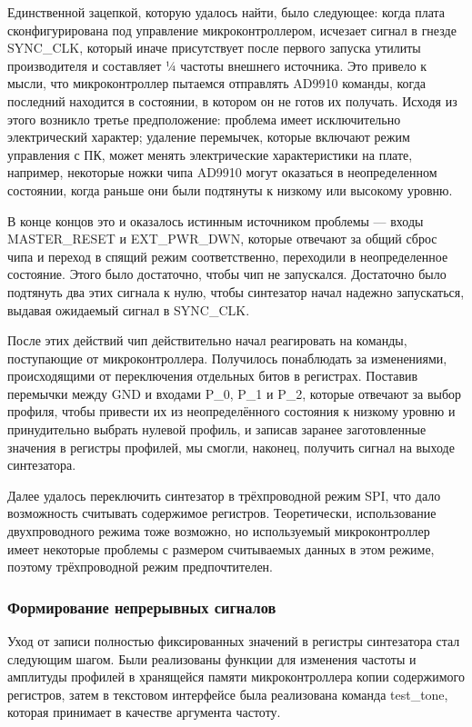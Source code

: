 \documentclass[rusmathsym, eqnumwithinsec, amspack, hyperref]{bomgost}
\begin{document}
Единственной зацепкой, которую удалось найти, было следующее: когда плата сконфигурирована под управление микроконтроллером, исчезает сигнал в гнезде SYNC\_CLK, который иначе присутствует после первого запуска утилиты производителя и составляет ¼ частоты внешнего источника. Это привело к мысли, что микроконтроллер пытаемся отправлять AD9910 команды, когда последний находится в состоянии, в котором он не готов их получать. Исходя из этого возникло третье предположение: проблема имеет исключительно электрический характер; удаление перемычек, которые включают режим управления с ПК, может менять электрические характеристики на плате, например, некоторые ножки чипа AD9910 могут оказаться в неопределенном состоянии, когда раньше они были подтянуты к низкому или высокому уровню.

В конце концов это и оказалось истинным источником проблемы --- входы MASTER\_RESET и EXT\_PWR\_DWN, которые отвечают за общий сброс чипа и переход в спящий режим соответственно, переходили в неопределенное состояние. Этого было достаточно, чтобы чип не запускался. Достаточно было подтянуть два этих сигнала к нулю, чтобы синтезатор начал надежно запускаться, выдавая ожидаемый сигнал в SYNC\_CLK.

После этих действий чип действительно начал реагировать на команды, поступающие от микроконтроллера. Получилось понаблюдать за изменениями, происходящими от переключения отдельных битов в регистрах. Поставив перемычки между GND и входами P\_0, P\_1 и P\_2, которые отвечают за выбор профиля, чтобы привести их из неопределённого состояния к низкому уровню и принудительно выбрать нулевой профиль, и записав заранее заготовленные значения в регистры профилей, мы смогли, наконец, получить сигнал на выходе синтезатора.

Далее удалось переключить синтезатор в трёхпроводной режим SPI, что дало возможность считывать содержимое регистров. Теоретически, использование двухпроводного режима тоже возможно, но используемый микроконтроллер имеет некоторые проблемы с размером считываемых данных в этом режиме, поэтому трёхпроводной режим предпочтителен.

\subsubsection{Формирование непрерывных сигналов}

Уход от записи полностью фиксированных значений в регистры синтезатора стал следующим шагом. Были реализованы функции для изменения частоты и амплитуды профилей в хранящейся памяти микроконтроллера копии содержимого регистров, затем в текстовом интерфейсе была реализована команда test\_tone, которая принимает в качестве аргумента частоту.
\end{document}
